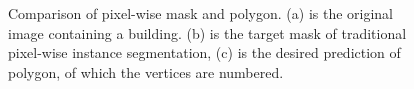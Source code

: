 \begin{figure}[!h]
	\centering
    \caption[Comparison of pixel-wise mask and polygon]{Comparison of pixel-wise mask and polygon. (a) is the original image containing a building. (b) is the target mask of traditional pixel-wise instance segmentation, (c) is the desired prediction of polygon, of which the vertices are numbered.}
	\label{fig:egcmp}
\end{figure}